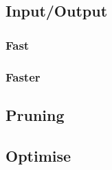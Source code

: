\documentclass{article}
\begin{document}
\subsection{Input/Output}
\subsubsection{Fast}

\subsubsection{Faster}


\subsection{Pruning}


\subsection{Optimise}

\end{document}
